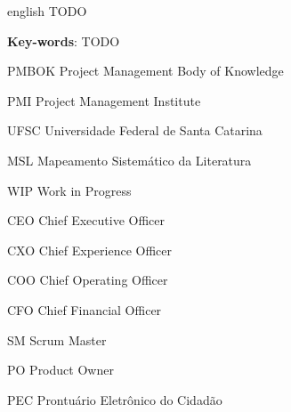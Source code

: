 \documentclass[
    12pt,       %
    openright,      %
    twoside,      %
    a4paper,      %
    english,      %
    french,       %
    spanish,      %
    brazil,       %
    ]{abntex2}
\begin{document}
  \begin{resumo}[Abstract]
   \begin{otherlanguage*}{english}
TODO
     \vspace{\onelineskip}

     \noindent
     \textbf{Key-words}: TODO
   \end{otherlanguage*}
  \end{resumo}

  \listoffigures*
  \cleardoublepage

  \listoftables*
  \cleardoublepage

  \begin{siglas}
    \item[PMBOK] Project Management Body of Knowledge
    \item[PMI]  Project Management Institute
    \item[UFSC] Universidade Federal de Santa Catarina
    \item[MSL] Mapeamento Sistemático da Literatura
    \item[WIP] Work in Progress
    \item[CEO] Chief Executive Officer
    \item[CXO] Chief Experience Officer
    \item[COO] Chief Operating Officer
    \item[CFO] Chief Financial Officer
    \item[SM] Scrum Master
    \item[PO] Product Owner
    \item[PEC] Prontuário Eletrônico do Cidadão

 \end{siglas}

  \tableofcontents*
  \cleardoublepage



  \textual


\end{document}
